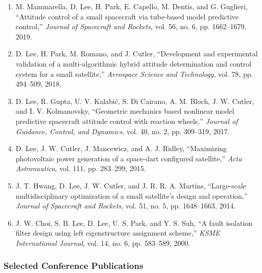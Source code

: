 \begin{enumerate}
  \item M. Mammarella, D. Lee, H. Park, E. Capello, M. Dentis, and G. Guglieri, ``Attitude control of a small spacecraft via tube-based model predictive control,'' \textit{Journal of Spacecraft and Rockets}, vol. 56, no. 6, pp. 1662--1679, 2019.
  \item D. Lee, H. Park, M. Romano, and J. Cutler, ``Development and experimental validation of a multi-algorithmic hybrid attitude determination and control system for a small satellite,'' \textit{Aerospace Science and Technology}, vol. 78, pp. 494--509, 2018.
  \item D. Lee, R. Gupta, U. V. Kalabi\'{c}, S. Di Cairano, A. M. Bloch, J. W. Cutler, and I. V. Kolmanovsky, ``Geometric mechanics based nonlinear model predictive spacecraft attitude control with reaction wheels,'' \textit{Journal of Guidance, Control, and Dynamics}, vol. 40, no. 2, pp. 309--319, 2017.
  \item D. Lee, J. W. Cutler, J. Mancewicz, and A. J. Ridley, ``Maximizing photovoltaic power generation of a space-dart configured satellite,'' \textit{Acta Astronautica}, vol. 111, pp. 283--299, 2015.
  \item J. T. Hwang, D. Lee, J. W. Cutler, and J. R. R. A. Martins, ``Large-scale multidisciplinary optimization of a small satellite's design and operation,'' \textit{Journal of Spacecraft and Rockets}, vol. 51, no. 5, pp. 1648--1663, 2014.
  \item J. W. Choi, S. B. Lee, D. Lee, U. S. Park, and Y. S. Suh, ``A fault isolation filter design using left eigenstructure assignment scheme,'' \textit{KSME International Journal}, vol. 14, no. 6, pp. 583--589, 2000.
\end{enumerate}

\subsubsection{Selected Conference Publications}

